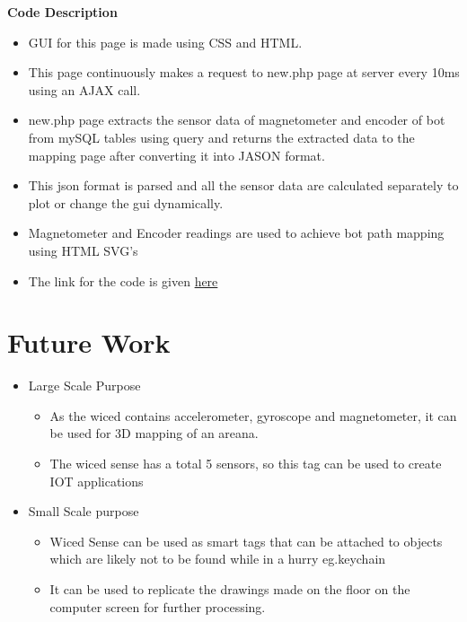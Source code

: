 \documentclass[a4paper,12pt,oneside]{book}
\begin{document}
\begin{itemize}
 \textbf{Code Description}
        
        \begin{itemize}
        \item GUI for this page is made using CSS and HTML.
        \item This page continuously makes a request to new.php page at server every 10ms using an AJAX call.
        \item new.php page extracts the sensor data of magnetometer and encoder of bot from mySQL tables using query and returns the extracted data to the mapping page after converting it into JASON format.
        \item This json format is parsed and all the sensor data are calculated separately to plot or change the gui dynamically.
        \item Magnetometer and Encoder readings are used to achieve bot path mapping using HTML SVG's
        \item The link for the code is given \href{https://github.com/eYSIP-2016/Wiced-Sense/blob/master/Codes/wiced%20web/javascript/mapping.js}{here}
        \end{itemize}














\newpage
\section{Future Work}
\begin{itemize}
\item{Large Scale Purpose}
\begin{itemize}
\item{As the wiced contains accelerometer, gyroscope and magnetometer, it can be used for 3D mapping of an areana.}
\item{The wiced sense has a total 5 sensors, so this tag can be used to create IOT applications}
\end{itemize}
\item{Small Scale purpose}
\begin{itemize}
\item{Wiced Sense can be used as smart tags that can be attached to objects which are likely not to be found while in a hurry eg.keychain}
\item {It can be used to replicate the drawings made on the floor on the computer screen for further processing.}
\end{itemize}
\end{itemize}



\end{itemize}
\end{document}
